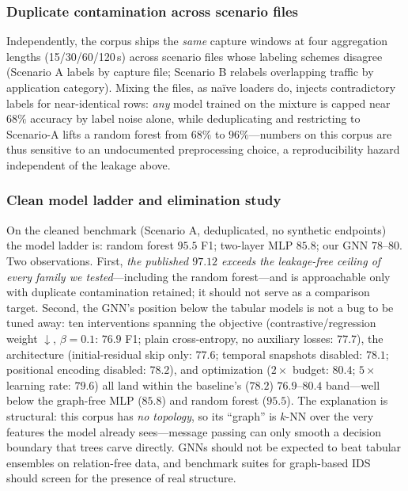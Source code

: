 \documentclass[journal]{IEEEtran}
\begin{document}
\subsubsection{Duplicate contamination across scenario files}
Independently, the corpus ships the \emph{same} capture windows at
four aggregation lengths (15/30/60/120\,s) across scenario files whose
labeling schemes disagree (Scenario A labels by capture file;
Scenario B relabels overlapping traffic by application category).
Mixing the files, as na\"ive loaders do, injects contradictory labels
for near-identical rows: \emph{any} model trained on the mixture is
capped near $68\%$ accuracy by label noise alone, while deduplicating
and restricting to Scenario-A lifts a random forest from $68\%$ to
$96\%$---numbers on this corpus are thus sensitive to an undocumented
preprocessing choice, a reproducibility hazard independent of the
leakage above.

\subsubsection{Clean model ladder and elimination study}
On the cleaned benchmark (Scenario A, deduplicated, no synthetic
endpoints) the model ladder is: random forest
$95.5$ F1; two-layer MLP $85.8$; our GNN $78$--$80$. Two observations.
First, \emph{the published $97.12$ exceeds the leakage-free ceiling of
every family we tested}---including the random forest---and is
approachable only with duplicate contamination retained; it should not
serve as a comparison target. Second, the GNN's position below the
tabular models is not a bug to be tuned away: ten interventions
spanning the objective (contrastive/regression weight $\downarrow$,
$\beta{=}0.1$: $76.9$ F1; plain cross-entropy, no auxiliary losses:
$77.7$), the architecture (initial-residual skip only: $77.6$;
temporal snapshots disabled: $78.1$; positional encoding disabled:
$78.2$), and optimization ($2\times$ budget: $80.4$; $5\times$
learning rate: $79.6$) all land within the baseline's ($78.2$)
$76.9$--$80.4$ band---well below the graph-free MLP ($85.8$) and
random forest ($95.5$). The explanation is structural: this corpus has
\emph{no topology}, so its ``graph'' is $k$-NN over the very features
the model already sees---message passing can only smooth a decision
boundary that trees carve directly. GNNs should not be expected to
beat tabular ensembles on relation-free data, and benchmark suites for
graph-based IDS should screen for the presence of real structure.
\end{document}
